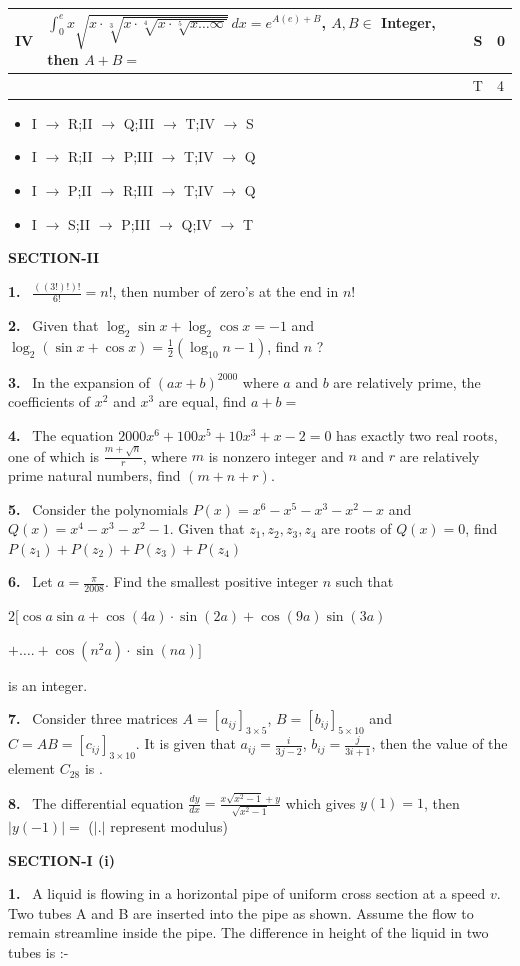 \documentclass[10pt]{extarticle}
\newcommand{\papersec}[1]{\par\bigskip{\centering\Large\bfseries PAPER-#1\par}\medskip}
\newcommand{\partsec}[2]{\par\medskip\noindent{\large\bfseries PART-#1: #2}\par\smallskip}
\newcommand{\sect}[1]{\par\smallskip\noindent\textbf{#1}\par}
\newcommand{\qn}[1]{\par\smallskip\noindent\textbf{#1.}~}
\newenvironment{qoptions}{\begin{itemize}[leftmargin=1.8em,itemsep=1pt,topsep=2pt,label={}]}{\end{itemize}}
\newcommand{\opt}[2]{\item[(#1)] #2}
\begin{document}
\begin{multicols}{2}
{\begin{tabular}{|c|L{4.8cm}|c|L{1.2cm}|}
IV & $\displaystyle\int_0^e x\sqrt{x\cdot\sqrt[3]{x\cdot\sqrt[4]{x\cdot\sqrt[5]{x\ldots\infty}}}}\,dx=e^{A(e)+B}$, $A,B\in$ Integer, then $A+B=$ & S & 0\\\hline
 & & T & 4\\\hline
\end{tabular}}\par
\begin{qoptions}
\opt{A}{I $\rightarrow$ R;II $\rightarrow$ Q;III $\rightarrow$ T;IV $\rightarrow$ S}
\opt{B}{I $\rightarrow$ R;II $\rightarrow$ P;III $\rightarrow$ T;IV $\rightarrow$ Q}
\opt{C}{I $\rightarrow$ P;II $\rightarrow$ R;III $\rightarrow$ T;IV $\rightarrow$ Q}
\opt{D}{I $\rightarrow$ S;II $\rightarrow$ P;III $\rightarrow$ Q;IV $\rightarrow$ T}
\end{qoptions}
\sect{SECTION-II}
\qn{1} $\frac{((3!)!)!}{6!}=n!$, then number of zero's at the end in $n!$
\qn{2} Given that $\log_2\sin x+\log_2\cos x=-1$ and $\log_2(\sin x+\cos x)=\frac12(\log_{10}n-1)$, find $n$ ?
\qn{3} In the expansion of $(ax+b)^{2000}$ where $a$ and $b$ are relatively prime, the coefficients of $x^2$ and $x^3$ are equal, find $a+b=$ \underline{\hspace{1cm}}
\qn{4} The equation $2000x^6+100x^5+10x^3+x-2=0$ has exactly two real roots, one of which is $\frac{m+\sqrt n}{r}$, where $m$ is nonzero integer and $n$ and $r$ are relatively prime natural numbers, find $(m+n+r)$.
\qn{5} Consider the polynomials $P(x)=x^6-x^5-x^3-x^2-x$ and $Q(x)=x^4-x^3-x^2-1$. Given that $z_1,z_2,z_3,z_4$ are roots of $Q(x)=0$, find $P(z_1)+P(z_2)+P(z_3)+P(z_4)$
\qn{6} Let $a=\frac{\pi}{2008}$. Find the smallest positive integer $n$ such that\par
$2\Big[\cos a\sin a+\cos(4a)\cdot\sin(2a)+\cos(9a)\sin(3a)$\par$+\ldots.+\cos\left(n^2a\right)\cdot\sin(na)\Big]$\par
is an integer.
\qn{7} Consider three matrices $A=[a_{ij}]_{3\times5}$, $B=[b_{ij}]_{5\times10}$ and $C=AB=[c_{ij}]_{3\times10}$. It is given that $a_{ij}=\frac{i}{3j-2}$, $b_{ij}=\frac{j}{3i+1}$, then the value of the element $C_{28}$ is \underline{\hspace{1.5cm}}.
\qn{8} The differential equation $\frac{dy}{dx}=\frac{x\sqrt{x^2-1}+y}{\sqrt{x^2-1}}$ which gives $y(1)=1$, then $|y(-1)|=$ \underline{\hspace{1cm}} ($|.|$ represent modulus)
\raggedcolumns
\papersec{2}
\partsec{1}{PHYSICS}
\sect{SECTION-I (i)}
\qn{1} A liquid is flowing in a horizontal pipe of uniform cross section at a speed $v$. Two tubes A and B are inserted into the pipe as shown. Assume the flow to remain streamline inside the pipe. The difference in height of the liquid in two tubes is :-\par

\end{multicols}
\end{document}
